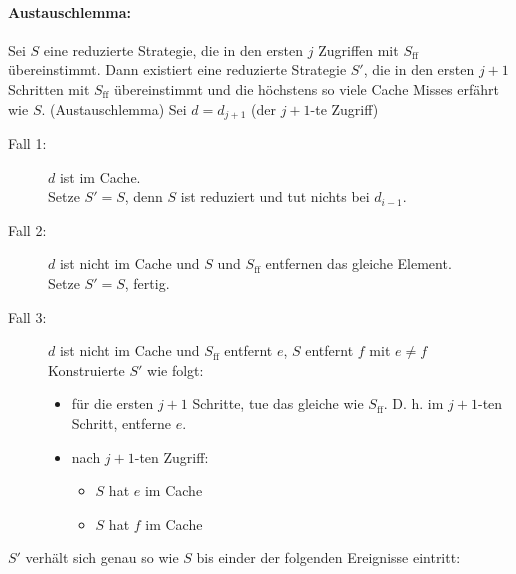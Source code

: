 \paragraph{Austauschlemma:} Sei $S$ eine reduzierte Strategie, die in den ersten $j$ Zugriffen mit $S_{\text{ff}}$ übereinstimmt. Dann existiert eine reduzierte Strategie $S'$, die in den ersten $j+1$ Schritten mit $S_{\text{ff}}$ übereinstimmt und die höchstens so viele Cache Misses erfährt wie $S$.
\Bew (Austauschlemma) Sei $d = d_{j+1}$ (der $j+1$-te Zugriff)
\begin{description}
 \item[Fall 1:] $d$ ist im Cache.\\
     Setze $S' = S$, denn $S$ ist reduziert und tut nichts bei $d_{i-1}$.
 \item[Fall 2:] $d$ ist nicht im Cache und $S$ und $S_{\text{ff}}$ entfernen das gleiche Element.\\
     Setze $S' = S$, fertig.
 \item[Fall 3:] $d$ ist nicht im Cache und $S_{\text{ff}}$ entfernt $e$, $S$ entfernt $f$ mit $e \neq f$\\
     Konstruierte $S'$ wie folgt:
     \begin{itemize}
      \item für die ersten $j+1$ Schritte, tue das gleiche wie $S_{\text{ff}}$. D. h. im $j+1$-ten Schritt, entferne $e$.
      \item nach $j+1$-ten Zugriff:
          \begin{itemize}
           \item $S$ hat $e$ im Cache
           \item $S$ hat $f$ im Cache
          \end{itemize}
     \end{itemize}
\end{description}
$S'$ verhält sich genau so wie $S$ bis einder der folgenden Ereignisse eintritt:
\renewcommand{\labelenumi}{(\theenumi)}
\renewcommand{\theenumi}{\roman{enumi}}
